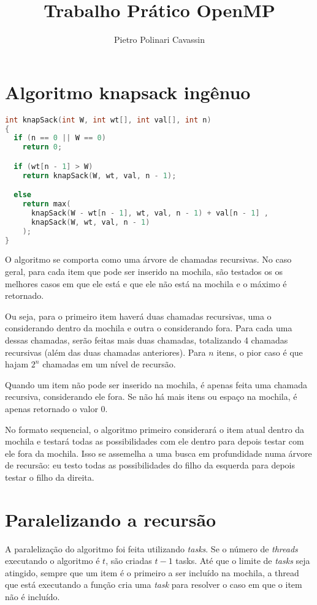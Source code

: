 \documentclass{article}
\title{Trabalho Prático OpenMP}
\author{
    Pietro Polinari Cavassin
}
\begin{document}
\maketitle

\section{Algoritmo knapsack ingênuo}

\begin{lstlisting}[language=c]
int knapSack(int W, int wt[], int val[], int n)
{
  if (n == 0 || W == 0)
    return 0;

  if (wt[n - 1] > W)
    return knapSack(W, wt, val, n - 1);

  else
    return max(
      knapSack(W - wt[n - 1], wt, val, n - 1) + val[n - 1] ,
      knapSack(W, wt, val, n - 1)
    );
}
\end{lstlisting}

O algoritmo se comporta como uma árvore de chamadas recursivas.
No caso geral, para cada item que pode ser inserido na 
mochila, são testados os
os melhores casos em que ele está e que ele não está
na mochila e o máximo é retornado.

Ou seja, para o primeiro item haverá duas chamadas
recursivas, uma o considerando dentro da mochila e outra
o considerando fora. Para cada uma dessas chamadas, serão feitas
mais duas chamadas, totalizando 4 chamadas recursivas (além 
das duas chamadas anteriores). Para
$n$ itens, o pior caso é que hajam $2^n$ chamadas em um nível
de recursão.

Quando um item não pode ser inserido na mochila, 
é apenas feita uma chamada recursiva, considerando ele fora.
Se não há mais itens ou espaço na mochila, é apenas retornado
o valor 0.

No formato sequencial, o algoritmo primeiro considerará o item
atual dentro da mochila e testará todas as possibilidades 
com ele dentro para depois testar com ele fora da mochila. 
Isso se assemelha a uma busca em profundidade numa árvore de 
recursão: eu testo todas as possibilidades do filho da esquerda
para depois testar o filho da direita.

\section {Paralelizando a recursão}

A paralelização do algoritmo foi feita utilizando 
\textit{tasks}. Se o número de \textit{threads} executando o
algoritmo é $t$, são criadas $t-1$ tasks. 
Até que o limite de \textit{tasks} seja atingido, sempre que
um item é o primeiro a ser incluído na mochila, a thread 
que está executando a função cria uma \textit{task} para 
resolver o caso em que o item não é incluído.
\end{document}
